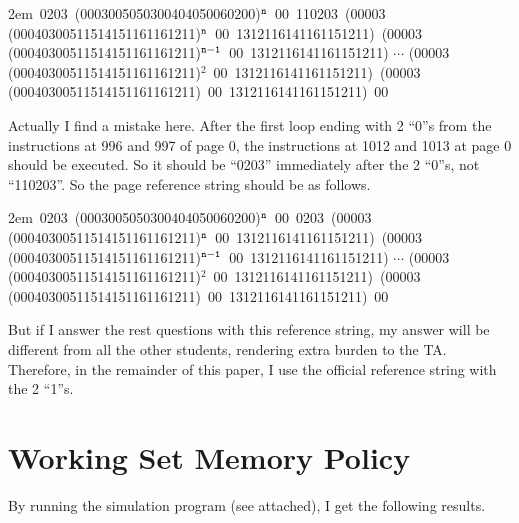 \documentclass[12pt,letterpaper]{article}
\begin{document}
\vspace{2ex}

\hangindent2em \,0203 \,(0003005050300404050060200)$\tt ^n$ \,00 \,110203 \,(00003 \,(00040300511514151161161211)$\tt ^n$ \,00 \,1312116141161151211) \,(00003 \,(00040300511514151161161211)$\tt ^{n-1}$ \,00 \,1312116141161151211) $\cdots$ (00003 \,(00040300511514151161161211)$^2$ \,00 \,1312116141161151211) \,(00003 \,(00040300511514151161161211) \,00 \,1312116141161151211) \,00

Actually I find a mistake here. After the first loop ending with 2 ``0''s from the instructions at 996 and 997 of page 0, the instructions at 1012 and 1013 at page 0 should be executed. So it should be ``0203'' immediately after the 2 ``0''s, not ``110203''. So the page reference string should be as follows.

\hangindent2em \,0203 \,(0003005050300404050060200)$\tt ^n$ \,00 \,0203 \,(00003 \,(00040300511514151161161211)$\tt ^n$ \,00 \,1312116141161151211) \,(00003 \,(00040300511514151161161211)$\tt ^{n-1}$ \,00 \,1312116141161151211) $\cdots$ (00003 \,(00040300511514151161161211)$^2$ \,00 \,1312116141161151211) \,(00003 \,(00040300511514151161161211) \,00 \,1312116141161151211) \,00

But if I answer the rest questions with this reference string, my answer will be different from all the other students, rendering extra burden to the TA. Therefore, in the remainder of this paper, I use the official reference string with the 2 ``1''s.

\section{Working Set Memory Policy}
By running the simulation program (see attached), I get the following results.
\end{document}
